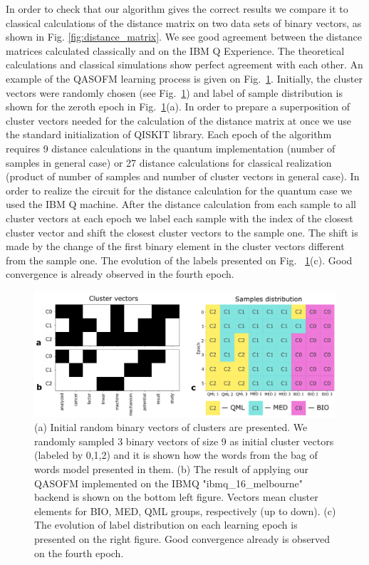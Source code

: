 \documentclass[pra,showkeys,twocolumn,showpacs]{revtex4-1}
\begin{document}
In order to check that our algorithm gives the correct results we compare it to classical calculations of the distance matrix on two data sets of binary vectors, as shown in Fig. \ref{fig:distance_matrix}.  
We see good agreement between the distance matrices calculated classically and on the IBM Q Experience. 
The theoretical calculations and classical simulations show perfect agreement with each other. 
An example of the QASOFM learning process is given on Fig.~\ref{fig:convergence}. 
Initially, the cluster vectors were randomly chosen (see Fig.~\ref{fig:convergence}) and label of sample distribution is shown for the zeroth epoch in Fig.~\ref{fig:convergence}(a). 
In order to prepare a superposition of cluster vectors needed for the calculation of the distance matrix at once we use the standard initialization of QISKIT library. 
Each epoch of the algorithm requires 9 distance calculations in the  quantum implementation (number of samples in general case) or 27 distance calculations for classical realization (product of number of samples and number of cluster vectors in general case). 
In order to realize the circuit for the distance calculation for the quantum case we used the IBM Q machine. 
After the distance calculation from each sample to all cluster vectors at each epoch we label each sample with the index of the closest cluster vector and shift the closest cluster vectors to the sample one. 
The shift is made by the change of the first binary element in the cluster vectors different from the sample one. 
The evolution of the labels presented on Fig. ~\ref{fig:convergence}(c).  
Good convergence is already observed in the fourth epoch.


\begin{figure}[t]
	\label{fig:convergence}
	\includegraphics[width=0.95\columnwidth]{convergence.png}
	\caption{
		(a) Initial random binary vectors of clusters are presented. We randomly sampled 3 binary vectors of size 9 as initial cluster vectors (labeled by 0,1,2) and it is shown how the words from the bag of words model presented in them. 
		(b) The result of applying our QASOFM implemented on the IBMQ "ibmq\_16\_melbourne" backend is shown on the bottom left figure. 
		Vectors mean cluster elements for BIO, MED, QML groups, respectively (up to down). 
		(c) The evolution of label distribution on each learning epoch is presented on the right figure. 
		Good convergence already is observed on the fourth epoch.
	} 
\end{figure}
\end{document}
